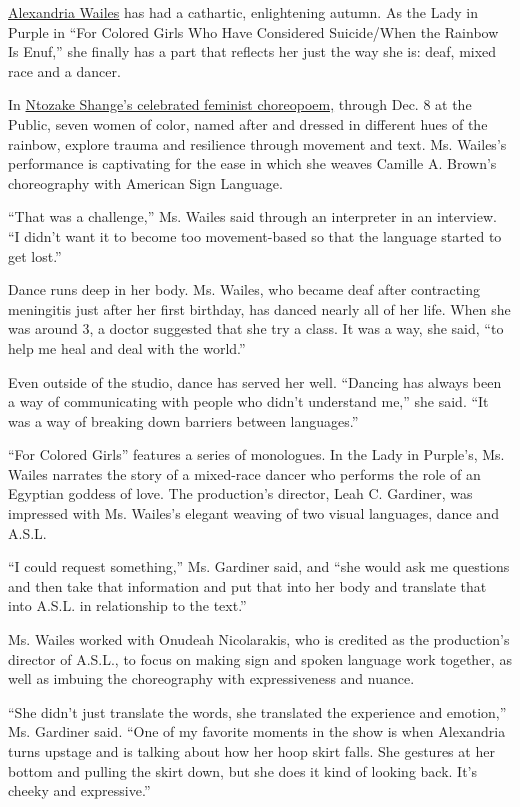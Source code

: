 \href{http://www.alexandriawailes.com/}{Alexandria Wailes} has had a
cathartic, enlightening autumn. As the Lady in Purple in ``For Colored
Girls Who Have Considered Suicide/When the Rainbow Is Enuf,'' she
finally has a part that reflects her just the way she is: deaf, mixed
race and a dancer.

In
\href{https://www.nytimes3xbfgragh.onion/2019/10/09/arts/dance/for-colored-girls.html}{Ntozake
Shange's celebrated feminist choreopoem,} through Dec. 8 at the Public,
seven women of color, named after and dressed in different hues of the
rainbow, explore trauma and resilience through movement and text. Ms.
Wailes's performance is captivating for the ease in which she weaves
Camille A. Brown's choreography with American Sign Language.

``That was a challenge,'' Ms. Wailes said through an interpreter in an
interview. ``I didn't want it to become too movement-based so that the
language started to get lost.''

Dance runs deep in her body. Ms. Wailes, who became deaf after
contracting meningitis just after her first birthday, has danced nearly
all of her life. When she was around 3, a doctor suggested that she try
a class. It was a way, she said, ``to help me heal and deal with the
world.''

Even outside of the studio, dance has served her well. ``Dancing has
always been a way of communicating with people who didn't understand
me,'' she said. ``It was a way of breaking down barriers between
languages.''

``For Colored Girls'' features a series of monologues. In the Lady in
Purple's, Ms. Wailes narrates the story of a mixed-race dancer who
performs the role of an Egyptian goddess of love. The production's
director, Leah C. Gardiner, was impressed with Ms. Wailes's elegant
weaving of two visual languages, dance and A.S.L.

``I could request something,'' Ms. Gardiner said, and ``she would ask me
questions and then take that information and put that into her body and
translate that into A.S.L. in relationship to the text.''

Ms. Wailes worked with Onudeah Nicolarakis, who is credited as the
production's director of A.S.L., to focus on making sign and spoken
language work together, as well as imbuing the choreography with
expressiveness and nuance.

``She didn't just translate the words, she translated the experience and
emotion,'' Ms. Gardiner said. ``One of my favorite moments in the show
is when Alexandria turns upstage and is talking about how her hoop skirt
falls. She gestures at her bottom and pulling the skirt down, but she
does it kind of looking back. It's cheeky and expressive.''

